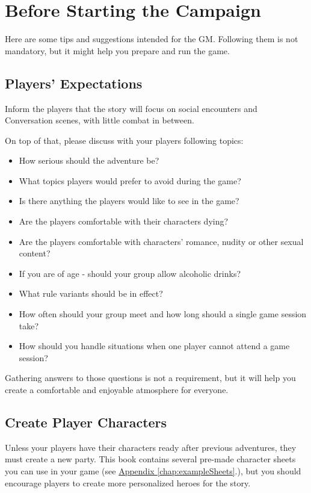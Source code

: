 \section{Before Starting the Campaign}

Here are some tips and suggestions intended for the GM. Following them is not mandatory, but it might help you prepare and run the game.

\subsection{Players’ Expectations}
\label{ssec:playersExpectations}

Inform the players that the story will focus on social encounters and Conversation scenes, with little combat in between.

On top of that, please discuss with your players following topics:
\begin{itemize}
	\item How serious should the adventure be?
	\item What topics players would prefer to avoid during the game?
	\item Is there anything the players would like to see in the game?
	\item Are the players comfortable with their characters dying?
	\item Are the players comfortable with characters’ romance, nudity or other sexual content?
	\item If you are of age - should your group allow alcoholic drinks?
	\item What rule variants should be in effect?
	\item How often should your group meet and how long should a single game session take?
	\item How should you handle situations when one player cannot attend a game session?
\end{itemize}

Gathering answers to those questions is not a requirement, but it will help you create a comfortable and enjoyable atmosphere for everyone.


\subsection{Create Player Characters}

Unless your players have their characters ready after previous adventures, they must create a new party. This book contains several pre-made character sheets you can use in your game (see \hyperref[chap:exampleSheets]{Appendix \ref{chap:exampleSheets}}.), but you should encourage players to create more personalized heroes for the story.

